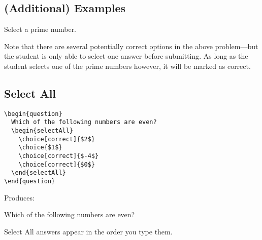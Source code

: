 \documentclass{ximera}
\begin{document}
\subsection{(Additional) Examples}


\begin{problem}
Select a prime number.
\begin{multipleChoice}
\end{multipleChoice}
\end{problem}

Note that there are several potentially correct options in the above
problem---but the student is only able to select one answer before submitting.
As long as the student selects one of the prime numbers however, it will be
marked as correct.

\subsection{Select All}

\begin{example}
\begin{verbatim}
\begin{question}
  Which of the following numbers are even?
  \begin{selectAll}
    \choice[correct]{$2$}
    \choice{$1$}
    \choice[correct]{$-4$}
    \choice[correct]{$0$}
  \end{selectAll}
\end{question}
\end{verbatim}
\end{example}

Produces:

\begin{question}
  Which of the following numbers are even?
  \begin{selectAll}
  \end{selectAll}
\end{question}

\begin{remark}
  Select All answers appear in the order you type them.
\end{remark}

\end{document}
